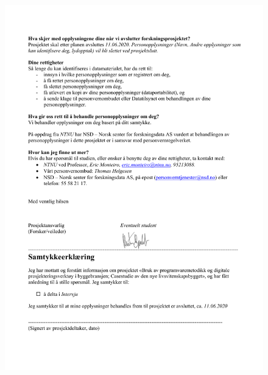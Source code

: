 \begin{figure}
    \centering
    \includegraphics[width=\textwidth]{appendix/side2-kontrakt.pdf}
\end{figure}